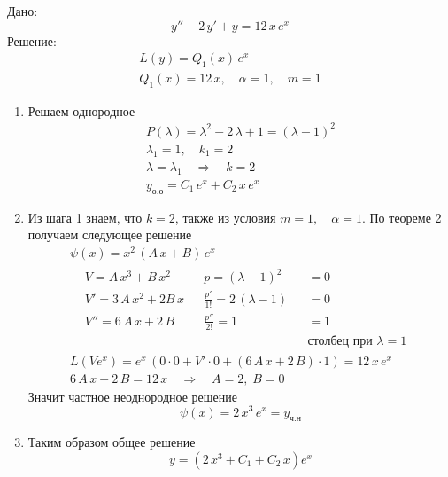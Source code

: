 \begin{Example}
	Дано: 
    \[
        y'' - 2\,y' + y = 12\,x\,e^x
    \]
	Решение:
    \begin{gather*}
        L(y) = Q_1(x)\,e^x\\
        Q_1(x) = 12\,x,\quad \alpha=1,\quad m = 1 
    \end{gather*} 
    \begin{enumerate}
        \item Решаем однородное
        \begin{gather*}
            P(\lambda) = \lambda^2 - 2\,\lambda + 1 = (\lambda - 	1)^2\\
            \lambda_1 = 1,\quad k_1 = 2\\
            \lambda = \lambda_1 \quad \Rightarrow \quad k = 2\\
            y_{\text{о.о}} = C_1\,e^x + C_2\,x\,e^x
        \end{gather*}
        
        \item Из шага 1 знаем, что $k = 2$, также из условия $m=1,\quad \alpha=1$. По теореме 2 получаем следующее решение
        \begin{gather*}
            \psi(x)=x^2\,(A\,x+B)\,e^x\\
            \begin{align*}
                & V = A\,x^3 + B\,x^2 && p=(\lambda-1)^2 && =0\\
                & V' = 3\,A\,x^2 + 2B\,x && \frac{p'}{1!} = 2\,(\lambda-1) && =0\\
                & V'' = 6\,A\,x + 2\,B && \frac{p''}{2!}=1 && = 1\\
                & && && \text{столбец при } \lambda = 1
            \end{align*}\\
            L(Ve^x) = e^x\,(0\cdot 0 + V' \cdot 0 + (6\,A\,x + 2\,B) \cdot 1) = 12\,x\,e^x\\
            6\,A\,x + 2\,B = 12\,x \quad \Rightarrow \quad A = 2,\; B = 0
        \end{gather*}
        Значит частное неоднородное решение
        \[
            \psi(x) = 2\,x^3\,e^x = y_{\text{ч.н}}
        \]
        
        \item Таким образом общее решение
        \[
            y=(2\,x^3+ C_1 + C_2\,x)e^x
        \]
    \end{enumerate}
\end{Example}

